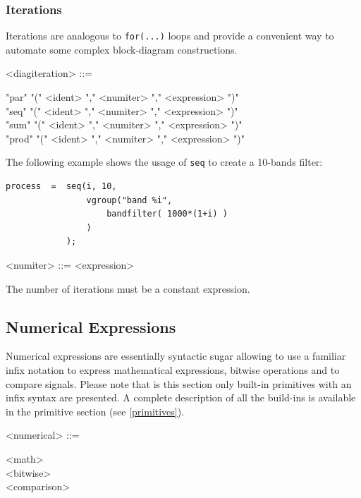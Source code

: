 \documentclass[a4paper,10pt]{book}
\begin{document}
 
\subsubsection{Iterations} 
Iterations are analogous to \lstinline'for(...)' loops and provide a convenient way to automate some complex block-diagram constructions. 

\begin{grammar}
  <diagiteration> ::= 
  \begin{syntdiag}
    \begin{stack}
       "par" "(" <ident> "," <numiter> "," <expression> ")"\\
      "seq" "(" <ident> "," <numiter> "," <expression> ")"\\
      "sum" "(" <ident> "," <numiter> "," <expression> ")"\\
      "prod" "(" <ident> "," <numiter> "," <expression> ")"
    \end{stack}
  \end{syntdiag}
\end{grammar}

The following example shows the usage of  \lstinline'seq' to create a 10-bands filter:

\begin{lstlisting}
process  =	seq(i, 10, 
				vgroup("band %i", 
					bandfilter( 1000*(1+i) ) 
				) 
			);
\end{lstlisting}

       
\begin{grammar}
  <numiter> ::= <expression>
\end{grammar}

The number of iterations must be a constant expression. 


\subsection{Numerical Expressions}

Numerical expressions are essentially syntactic sugar allowing to use a familiar infix notation to express mathematical expressions, bitwise operations and to compare signals. Please note that is this section only built-in primitives with an infix syntax are presented. A complete description of all the build-ins is available in the primitive section (see \ref{primitives}). 

\begin{grammar}
  <numerical> ::= 
  \begin{syntdiag}
    \begin{stack}
      <math>\\
      <bitwise>\\
      <comparison>
    \end{stack}
  \end{syntdiag}
\end{grammar}
\end{document}
